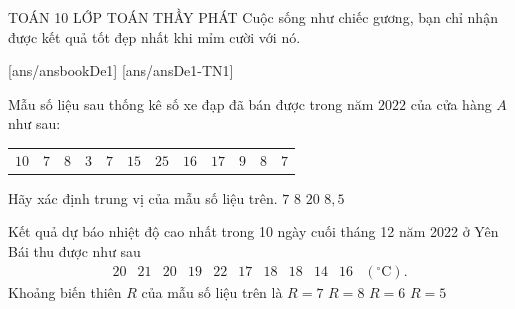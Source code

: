 \begin{name}
	{\tenchude}
	{TOÁN 10}
	{LỚP TOÁN THẦY PHÁT}
	{Cuộc sống như chiếc gương, bạn chỉ nhận được kết quả tốt đẹp nhất khi mỉm cười với nó.}
\end{name}
[ans/ansbookDe1]
\TN
{}[ans/ansDe1-TN1]
\begin{ex}%
Mẫu số liệu sau thống kê số xe đạp đã bán được trong năm $2022$ của cửa hàng $A$ như sau:
\begin{center}
\begin{tabular}{cccccccccccc}
$10$&$7$&$8$&$3$&$7$&$15$&$25$&$16$&$17$&$9$&$8$&$7$\\
\end{tabular}
\end{center}
Hãy xác định trung vị của mẫu số liệu trên.
\choice
{$7$}
{$8$}
{$20$}
{\True $8{,}5$}
\end{ex}

\begin{ex}%
Kết quả dự báo nhiệt độ cao nhất trong 10 ngày cuối tháng 12 năm 2022 ở Yên Bái thu được như sau
\[
\begin{array}{lllllllllll}
20 & 21 & 20 & 19 & 22 & 17 & 18 & 18 & 14 & 16 & \left({}^{\circ}\mathrm{C}\right) .
\end{array}
\]
Khoảng biến thiên $R$ của mẫu số liệu trên là
\choice
{$R=7$}
{\True $R=8$}
{$R=6$}
{$R=5$}
\end{ex}

